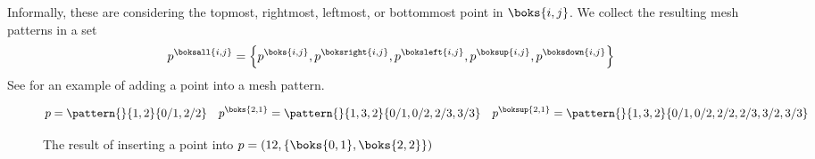 Informally, these are considering the topmost, rightmost, leftmost, or
bottommost point in \(\boks{i,j}\). We collect the resulting mesh patterns in a
set
\begin{equation*}
p^\boksall{i,j}=\left\{
p^\boks{i,j},
p^\boksright{i,j},
p^\boksleft{i,j},
p^\boksup{i,j},
p^\boksdown{i,j}\right\}
\end{equation*}
See  for an example of adding a point into a mesh pattern.

\begin{figure}
\begin{equation*}
p = \pattern{}{1,2}{0/1,2/2} \quad
p^\boks{2,1}= \pattern{}{1,3,2}{0/1,0/2,2/3,3/3}
\quad
p^\boksup{2,1}
= \pattern{}{1,3,2}{0/1,0/2,2/2,2/3,3/2,3/3}
\end{equation*}
\caption{The result of inserting a point into \(p=(12,\{\boks{0,1},\boks{2,2}\})\)}
\label{fig:addp}
\end{figure}

